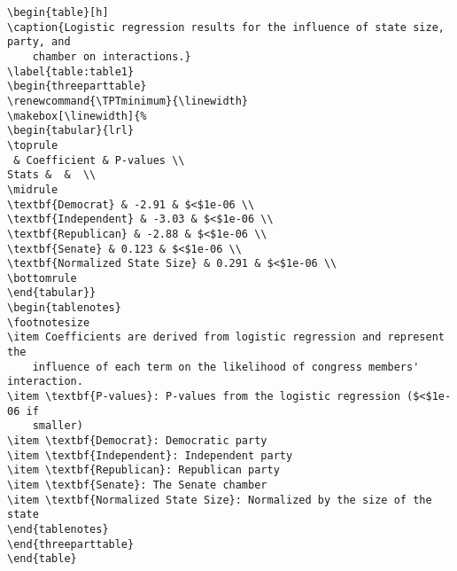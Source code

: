\documentclass[11pt]{article}
\begin{document}
\begin{Verbatim}[tabsize=4]
\begin{table}[h]
\caption{Logistic regression results for the influence of state size, party, and
	chamber on interactions.}
\label{table:table1}
\begin{threeparttable}
\renewcommand{\TPTminimum}{\linewidth}
\makebox[\linewidth]{%
\begin{tabular}{lrl}
\toprule
 & Coefficient & P-values \\
Stats &  &  \\
\midrule
\textbf{Democrat} & -2.91 & $<$1e-06 \\
\textbf{Independent} & -3.03 & $<$1e-06 \\
\textbf{Republican} & -2.88 & $<$1e-06 \\
\textbf{Senate} & 0.123 & $<$1e-06 \\
\textbf{Normalized State Size} & 0.291 & $<$1e-06 \\
\bottomrule
\end{tabular}}
\begin{tablenotes}
\footnotesize
\item Coefficients are derived from logistic regression and represent the
	influence of each term on the likelihood of congress members' interaction.
\item \textbf{P-values}: P-values from the logistic regression ($<$1e-06 if
	smaller)
\item \textbf{Democrat}: Democratic party
\item \textbf{Independent}: Independent party
\item \textbf{Republican}: Republican party
\item \textbf{Senate}: The Senate chamber
\item \textbf{Normalized State Size}: Normalized by the size of the state
\end{tablenotes}
\end{threeparttable}
\end{table}

\end{Verbatim}
\end{document}
